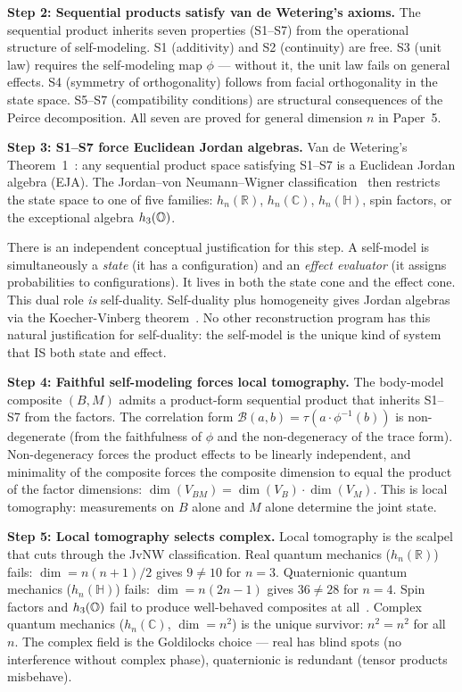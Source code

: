 \textbf{Step 2: Sequential products satisfy van de Wetering's axioms.}
The sequential product inherits seven properties (S1--S7) from the
operational structure of self-modeling.  S1 (additivity) and S2
(continuity) are free.  S3 (unit law) requires the self-modeling map
$\phi$ --- without it, the unit law fails on general effects.  S4
(symmetry of orthogonality) follows from facial orthogonality in the
state space.  S5--S7 (compatibility conditions) are structural
consequences of the Peirce decomposition.  All seven are proved for
general dimension $n$ in Paper~5.

\textbf{Step 3: S1--S7 force Euclidean Jordan algebras.}  Van de
Wetering's Theorem~1~\citep{vandewetering2018}: any sequential product
space satisfying S1--S7 is a Euclidean Jordan algebra (EJA).  The
Jordan--von Neumann--Wigner classification~\citep{jvnw1934} then
restricts the state space to one of five families: $h_n(\mathbb{R})$,
$h_n(\mathbb{C})$, $h_n(\mathbb{H})$, spin factors, or the
exceptional algebra $h_3(\mathbb{O})$.

There is an independent conceptual justification for this step.  A
self-model is simultaneously a \emph{state} (it has a configuration)
and an \emph{effect evaluator} (it assigns probabilities to
configurations).  It lives in both the state cone and the effect cone.
This dual role \emph{is} self-duality.  Self-duality plus homogeneity
gives Jordan algebras via the Koecher-Vinberg
theorem~\citep{farautkoranyi1994}.  No other reconstruction program
has this natural justification for self-duality: the self-model is the
unique kind of system that IS both state and effect.

\textbf{Step 4: Faithful self-modeling forces local tomography.}  The
body-model composite $(B, M)$ admits a product-form sequential product
that inherits S1--S7 from the factors.  The correlation form
$\mathcal{B}(a, b) = \tau(a \cdot \phi^{-1}(b))$ is non-degenerate
(from the faithfulness of $\phi$ and the non-degeneracy of the trace
form).  Non-degeneracy forces the product effects to be linearly
independent, and minimality of the composite forces the composite
dimension to equal the product of the factor dimensions:
$\dim(V_{BM}) = \dim(V_B) \cdot \dim(V_M)$.  This is local
tomography: measurements on $B$ alone and $M$ alone determine the
joint state.

\textbf{Step 5: Local tomography selects complex.}  Local tomography
is the scalpel that cuts through the JvNW classification.  Real
quantum mechanics ($h_n(\mathbb{R})$) fails: $\dim = n(n+1)/2$ gives
$9 \neq 10$ for $n = 3$.  Quaternionic quantum mechanics
($h_n(\mathbb{H})$) fails: $\dim = n(2n-1)$ gives $36 \neq 28$ for
$n = 4$.  Spin factors and $h_3(\mathbb{O})$ fail to produce well-behaved
composites at all~\citep{bgw2020}.  Complex quantum mechanics
($h_n(\mathbb{C})$, $\dim = n^2$) is the unique survivor: $n^2 = n^2$
for all $n$.  The complex field is the Goldilocks choice --- real has
blind spots (no interference without complex phase), quaternionic is
redundant (tensor products misbehave).

